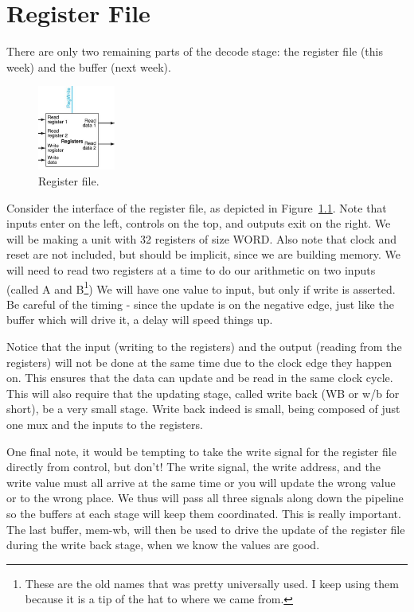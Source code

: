 \chapter{Register File}

There are only two remaining parts of the decode stage: the register file (this week) and the buffer (next week).
\begin{figure}
\caption{Register file.}\label{fig:regfile}
\begin{center}
\includegraphics[width=1in]{../images/regfile.png}
\end{center}
\end{figure}

Consider the interface of the register file, as depicted in Figure~\ref{fig:regfile}.  Note that inputs enter on the left, controls on the top, and outputs exit on the right.  We will be making a unit with 32 registers of size WORD.  Also note that clock and reset are not included, but should be implicit, since we are building memory.  We will need to read two registers at a time to do our arithmetic on two inputs (called A and B\footnote{These are the old names that was pretty universally used.  I keep using them because it is a tip of the hat to where we came from.})  We will have one value to input, but only if write is asserted.  Be careful of the timing - since the update is on the negative edge, just like the buffer which will drive it, a delay will speed things up.

Notice that the input (writing to the registers) and the output (reading from the registers) will not be done at the same time due to the clock edge they happen on.  This ensures that the data can update and be read in the same clock cycle.  This will also require that the updating stage, called write back (WB or w/b for short), be a very small stage.  Write back indeed is small, being composed of just one mux and the inputs to the registers.

One final note, it would be tempting to take the write signal for the register file directly from control, but don't!  The write signal, the write address, and the write value must all arrive at the same time or you will update the wrong value or to the wrong place. We thus will pass all three signals along down the pipeline so the buffers at each stage will keep them coordinated.  This is really important.  The last buffer, mem-wb, will then be used to drive the update of the register file during the write back stage, when we know the values are good.

